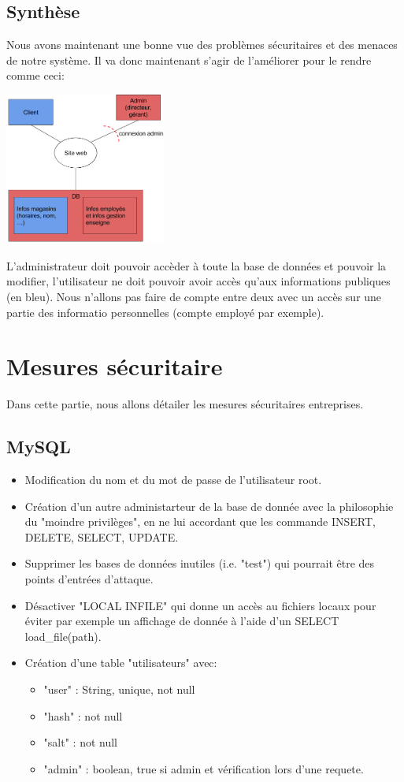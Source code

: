 \documentclass[a4paper]{article}
\begin{document}
\subsection{Synthèse}
Nous avons maintenant une bonne vue des problèmes sécuritaires et des menaces de notre système. Il va donc maintenant s'agir de l'améliorer pour le rendre comme ceci:\\
\begin{center}
 \includegraphics[width=200px]{img/systeme.png}
\end{center}

L'administrateur doit pouvoir accèder à toute la base de données et pouvoir la modifier, l'utilisateur ne doit pouvoir avoir accès qu'aux informations publiques (en bleu). Nous n'allons pas faire de compte entre deux avec un accès sur une partie des informatio  personnelles (compte employé par exemple).


\section{Mesures sécuritaire}
Dans cette partie, nous allons détailer les mesures sécuritaires entreprises.
\subsection{MySQL}
\begin{itemize}
\item Modification du nom et du mot de passe de l'utilisateur root.
\item Création d'un autre administarteur de la base de donnée avec la philosophie du "moindre privilèges", en ne lui accordant que les commande INSERT, DELETE, SELECT, UPDATE.
\item Supprimer les bases de données inutiles (i.e. "test") qui pourrait être des points d'entrées d'attaque.
\item Désactiver "LOCAL INFILE" qui donne un accès au fichiers locaux pour éviter par exemple un affichage de donnée à l'aide d'un SELECT load\_file(path).
\item Création d'une table "utilisateurs" avec: 
	\begin{itemize}
	\item "user" : String, unique, not null
	\item "hash" : not null
	\item "salt" : not null
	\item "admin" : boolean, true si admin et vérification lors d'une requete.
	\end{itemize}
\end{itemize}
\end{document}
